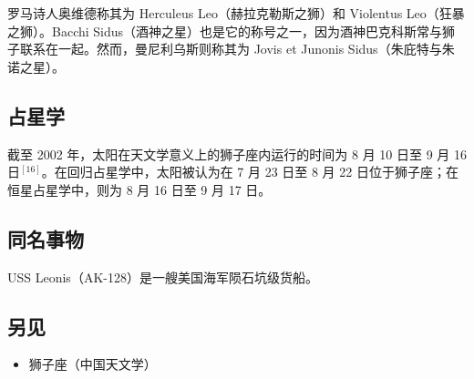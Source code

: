 罗马诗人奥维德称其为 Herculeus Leo（赫拉克勒斯之狮）和 Violentus Leo（狂暴之狮）。Bacchi Sidus（酒神之星）也是它的称号之一，因为酒神巴克科斯常与狮子联系在一起。然而，曼尼利乌斯则称其为 Jovis et Junonis Sidus（朱庇特与朱诺之星）。
\subsection{占星学}  
截至 2002 年，太阳在天文学意义上的狮子座内运行的时间为 8 月 10 日至 9 月 16 日$^{[16]}$。在回归占星学中，太阳被认为在 7 月 23 日至 8 月 22 日位于狮子座；在恒星占星学中，则为 8 月 16 日至 9 月 17 日。
\subsection{同名事物}  
USS Leonis（AK-128）是一艘美国海军陨石坑级货船。
\subsection{另见} 
\begin{itemize}
\item 狮子座（中国天文学）
\end{itemize}
